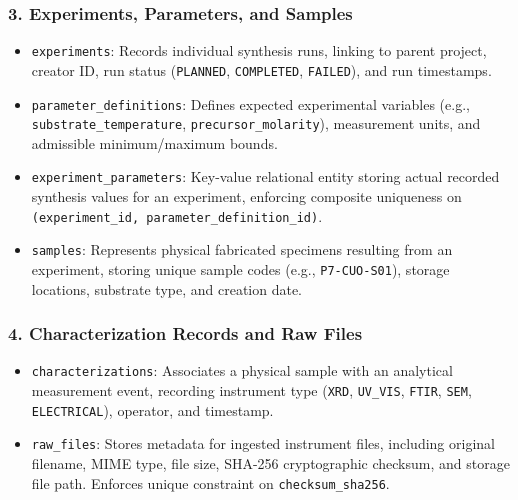 \documentclass[12pt,a4paper,oneside]{report}
\begin{document}
{{{\subsubsection{3. Experiments, Parameters, and Samples}
\begin{itemize}
    \item \texttt{experiments}: Records individual synthesis runs, linking to parent project, creator ID, run status (\texttt{PLANNED}, \texttt{COMPLETED}, \texttt{FAILED}), and run timestamps.
    \item \texttt{parameter\_definitions}: Defines expected experimental variables (e.g., \texttt{substrate\_temperature}, \texttt{precursor\_molarity}), measurement units, and admissible minimum/maximum bounds.
    \item \texttt{experiment\_parameters}: Key-value relational entity storing actual recorded synthesis values for an experiment, enforcing composite uniqueness on \texttt{(experiment\_id, parameter\_definition\_id)}.
    \item \texttt{samples}: Represents physical fabricated specimens resulting from an experiment, storing unique sample codes (e.g., \texttt{P7-CUO-S01}), storage locations, substrate type, and creation date.
\end{itemize}

\subsubsection{4. Characterization Records and Raw Files}
\begin{itemize}
    \item \texttt{characterizations}: Associates a physical sample with an analytical measurement event, recording instrument type (\texttt{XRD}, \texttt{UV\_VIS}, \texttt{FTIR}, \texttt{SEM}, \texttt{ELECTRICAL}), operator, and timestamp.
    \item \texttt{raw\_files}: Stores metadata for ingested instrument files, including original filename, MIME type, file size, SHA-256 cryptographic checksum, and storage file path. Enforces unique constraint on \texttt{checksum\_sha256}.
\end{itemize}

}}}
\end{document}
